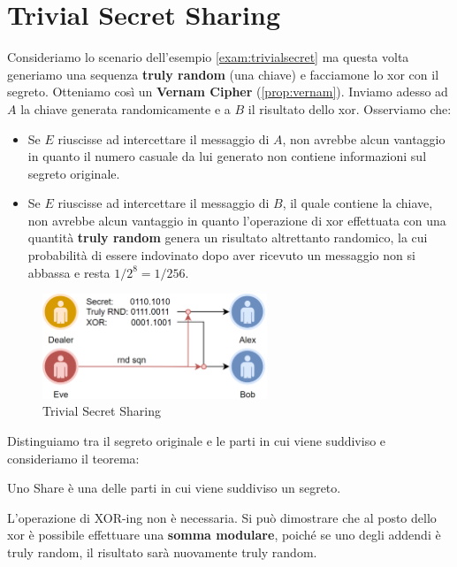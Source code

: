 \section{Trivial Secret Sharing}
\begin{example}
Consideriamo lo scenario dell'esempio \ref{exam:trivialsecret} ma questa volta generiamo una sequenza \textbf{truly random} (una chiave) e facciamone lo xor con il segreto. Otteniamo così un \textbf{Vernam Cipher} (\cref{prop:vernam}). Inviamo adesso ad $A$ la chiave generata randomicamente e a $B$ il risultato dello xor. Osserviamo che:
\begin{itemize}
    \item Se $E$ riuscisse ad intercettare il messaggio di $A$, non avrebbe alcun vantaggio in quanto il numero casuale da lui generato non contiene informazioni sul segreto originale.
    \item Se $E$ riuscisse ad intercettare il messaggio di $B$, il quale contiene la chiave, non avrebbe alcun vantaggio in quanto l'operazione di xor effettuata con una quantità \textbf{truly random} genera un risultato altrettanto randomico, la cui probabilità di essere indovinato dopo aver ricevuto un messaggio non si abbassa e resta $1/2^8=1/256$.
\end{itemize}
\end{example}
\begin{figure}[ht]
    \centering
    \includegraphics[width=0.6\textwidth]{image/secret_sharing/trivialsecret.png}
    \caption{Trivial Secret Sharing}
    \label{fig:trivialsecret}
\end{figure}
Distinguiamo tra il segreto originale e le parti in cui viene suddiviso e consideriamo il teorema:
\begin{definition}[Shares]\label{def:shares}
Uno Share è una delle parti in cui viene suddiviso un segreto.
\end{definition}\pagebreak
\begin{theorem}
L'operazione di XOR-ing non è necessaria. Si può dimostrare che al posto dello xor è possibile effettuare una \textbf{somma modulare}, poiché se uno degli addendi è truly random, il risultato sarà nuovamente truly random.
\end{theorem}
